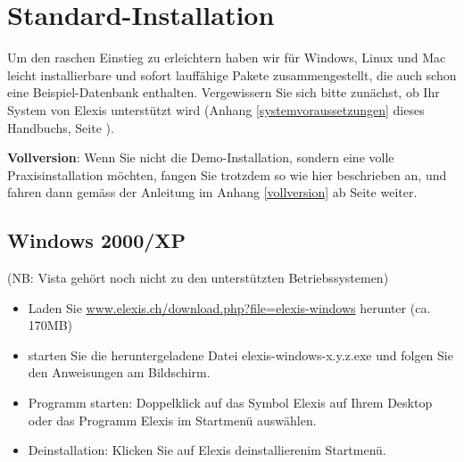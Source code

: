 
\section{Standard-Installation}
\label{easyistall}
Um den raschen Einstieg zu erleichtern haben wir für Windows, Linux und Mac leicht installierbare und sofort lauffähige Pakete zusammengestellt, die auch schon eine Beispiel-Datenbank enthalten.
Vergewissern Sie sich bitte zunächst, ob Ihr System von Elexis unterstützt wird (Anhang \ref{systemvoraussetzungen} dieses Handbuchs, Seite \pageref{systemvoraussetzungen}).\par
{}
\textbf{Vollversion}: Wenn Sie nicht die Demo-Installation, sondern eine volle Praxisinstallation möchten, fangen Sie trotzdem so wie hier beschrieben an, und fahren dann gemäss der Anleitung im Anhang \ref{vollversion} ab Seite \pageref{vollversion} weiter.
\subsection{Windows 2000/XP}
(NB: Vista gehört noch nicht zu den unterstützten Betriebssystemen)
\begin{itemize}
	\item Laden Sie \href{http://www.elexis.ch/download.php?file=elexis-windows}{www.elexis.ch/down\-load.php?file=elexis-windows} herunter (ca. 170MB)
	\item starten Sie die heruntergeladene Datei elexis-windows-x.y.z.exe und folgen Sie den Anweisungen am Bildschirm.
    \item Programm starten: Doppelklick auf das Symbol \glqq Elexis\grqq{} auf Ihrem Desktop oder das Programm \glqq Elexis\grqq{} im Startmenü auswählen.
	\item Deinstallation: Klicken Sie auf \glqq Elexis deinstallieren\grqq im  Startmenü.
\end{itemize}

